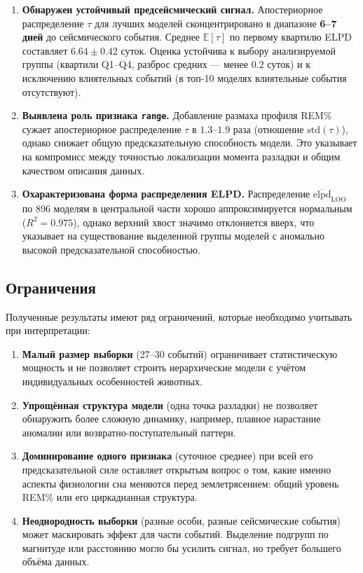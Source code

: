 \documentclass[14pt]{mmcs_article}
\begin{document}
\begin{enumerate}
		\item \textbf{Обнаружен устойчивый предсейсмический
			сигнал.} Апостериорное распределение $\tau$ для
		лучших моделей сконцентрировано в диапазоне
		\textbf{6--7 дней} до сейсмического события.
		Среднее $\mathbb{E}[\tau]$ по первому квартилю
		ELPD составляет $6.64 \pm 0.42$ суток. Оценка
		устойчива к выбору анализируемой группы
		(квартили Q1--Q4, разброс средних — менее $0.2$
		суток) и к исключению влиятельных событий
		(в топ-10 моделях влиятельные события
		отсутствуют).
		
		\item \textbf{Выявлена роль признака \texttt{range}.}
		Добавление размаха профиля REM\% сужает
		апостериорное распределение $\tau$ в $1.3$--$1.9$
		раза (отношение $\mathrm{std}(\tau)$), однако
		снижает общую предсказательную способность
		модели. Это указывает на компромисс между
		точностью локализации момента разладки и общим
		качеством описания данных.
		
		
		\item \textbf{Охарактеризована форма распределения
			ELPD.} Распределение
		$\overline{\mathrm{elpd}}_{\mathrm{LOO}}$ по 896
		моделям в центральной части хорошо
		аппроксимируется нормальным ($R^2 = 0.975$),
		однако верхний хвост значимо отклоняется вверх,
		что указывает на существование выделенной группы
		моделей с аномально высокой предсказательной
		способностью.
	\end{enumerate}
	
	\subsection*{Ограничения}
	
	Полученные результаты имеют ряд ограничений, которые
	необходимо учитывать при интерпретации:
	
	\begin{enumerate}
		\item \textbf{Малый размер выборки} (27--30 событий)
		ограничивает статистическую мощность и не
		позволяет строить иерархические модели с учётом
		индивидуальных особенностей животных.
		
		
		\item \textbf{Упрощённая структура модели} (одна точка
		разладки) не позволяет обнаружить более сложную
		динамику, например, плавное нарастание аномалии
		или возвратно-поступательный паттерн.
		
		\item \textbf{Доминирование одного признака}
		(суточное среднее) при всей его
		предсказательной силе оставляет открытым вопрос
		о том, какие именно аспекты физиологии сна
		меняются перед землетрясением: общий уровень
		REM\% или его циркадианная структура.
		
		\item \textbf{Неоднородность выборки} (разные особи,
		разные сейсмические события) может маскировать
		эффект для части событий. Выделение подгрупп по
		магнитуде или расстоянию могло бы усилить
		сигнал, но требует большего объёма данных.
	\end{enumerate}
	
\end{document}
